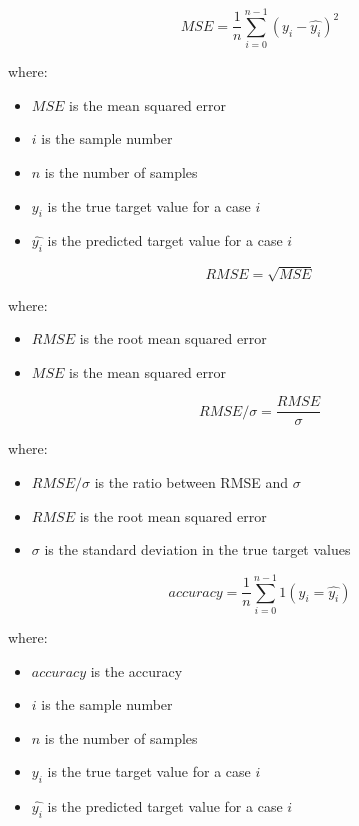 \documentclass[11pt,a4paper]{article}
\begin{document}
\begin{equation}
MSE = \frac{1}{n} \sum_{i=0}^{n-1} (y_{i}-\hat{y_{i}})^{2}
\end{equation}

\noindent
where:
\begin{itemize}
    \itemsep=0pt
    \item $MSE$ is the mean squared error
    \item $i$ is the sample number
    \item $n$ is the number of samples
    \item $y_{i}$ is the true target value for a case $i$
    \item $\hat{y_{i}}$  is the predicted target value for a case $i$
\end{itemize}

\begin{equation}
RMSE = \sqrt{MSE}
\end{equation}

\noindent
where:
\begin{itemize}
    \itemsep=0pt
    \item $RMSE$ is the root mean squared error
    \item $MSE$ is the mean squared error
\end{itemize}

\pagebreak

\begin{equation}
RMSE/\sigma = \frac{RMSE}{\sigma}
\end{equation}

\noindent
where:
\begin{itemize}
    \itemsep=0pt
    \item $RMSE/\sigma$ is the ratio between RMSE and $\sigma$
    \item $RMSE$ is the root mean squared error
    \item $\sigma$ is the standard deviation in the true target values
\end{itemize}

\begin{equation}
accuracy = \frac{1}{n} \sum_{i=0}^{n-1} 1(y_{i}=\hat{y_{i}})
\end{equation}

\noindent
where:
\begin{itemize}
    \itemsep=0pt
    \item $accuracy$ is the accuracy
    \item $i$ is the sample number
    \item $n$ is the number of samples
    \item $y_{i}$ is the true target value for a case $i$
    \item $\hat{y_{i}}$  is the predicted target value for a case $i$
\end{itemize}
\end{document}
